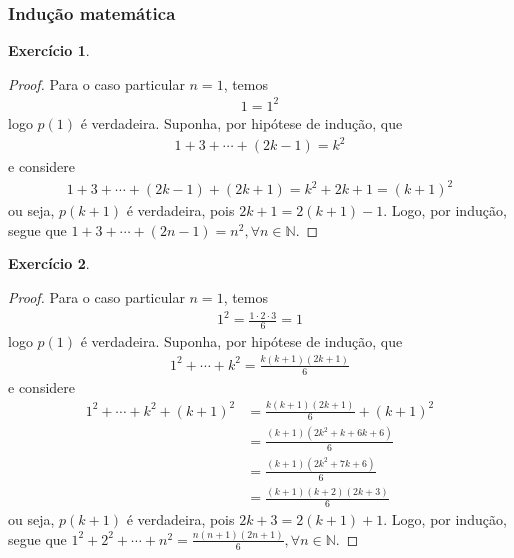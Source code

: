 \documentclass[a4paper,12pt]{article}
\theoremstyle{definition}
\newtheorem{exercise}{Exercício}%
\begin{document}
	\subsubsection*{Indução matemática}
	\begin{exercise}
		\begin{proof}
		Para o caso particular $n = 1$, temos
		\begin{align*}
		1 = 1^2
		\end{align*}
		logo $p(1)$ é verdadeira. Suponha, por hipótese de indução, que 
		\begin{align*}
		1 + 3 + \cdots + (2k-1) = k^2
		\end{align*}
		e considere
		\begin{align*}
		1 + 3 + \cdots + (2k - 1) + (2k + 1) = k^2 + 2k + 1 = (k + 1)^2
		\end{align*}
		ou seja, $p(k+1)$ é verdadeira, pois $2k + 1 = 2(k+1) - 1$. Logo, por indução, segue que $1 + 3 + \cdots + (2n-1) = n^2, \forall n\in\mathbb{N}$.
	\end{proof}
	\end{exercise}
	\begin{exercise}
		\begin{proof}
			Para o caso particular $n=1$, temos
			\begin{align*}
				1^2 = \frac{1\cdot 2\cdot 3}{6} = 1
			\end{align*}
			logo $p(1)$ é verdadeira. Suponha, por hipótese de indução, que 
			\begin{align*}
			1^2 + \cdots + k^2 = \frac{k(k+1)(2k+1)}{6}
			\end{align*}
			e considere
			\begin{align*}
			1^2 + \cdots + k^2 + (k+1)^2 &= \frac{k(k+1)(2k+1)}{6} + (k+1)^2 \\
			&= \frac{ (k+1)(2k^2+k+6k+6) }{ 6 } \\
			&= \frac{(k+1)(2k^2 + 7k + 6)  }{6} \\
			&= \frac{(k+1)(k+2)(2k+3) }{6}
			\end{align*}
			ou seja, $p(k+1)$ é verdadeira, pois $2k + 3 = 2(k+1) + 1$. Logo, por indução, segue que $1^2 + 2^2 + \cdots + n^2 = \displaystyle{ \frac{n(n+1)(2n+1)}{6} }, \forall n\in\mathbb{N}$.
		\end{proof}
	\end{exercise}
\end{document}
